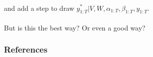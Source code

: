 \documentclass[xcolor=dvipsnames]{beamer}
\begin{document}
\begin{frame}
\begin{align*}
\end{align*}
and add a step to draw $y_{1:T}^*|V,W,\alpha_{1:T},\beta_{1:T},y_{1:T}$.\\~\\

But is this the best way? Or even a good way?
\end{frame}

\begin{frame}[allowframebreaks]
        \frametitle{References}
        
        
\end{frame} 
\setcounter{framenumber}{\value{finalframe}}
\end{document}
